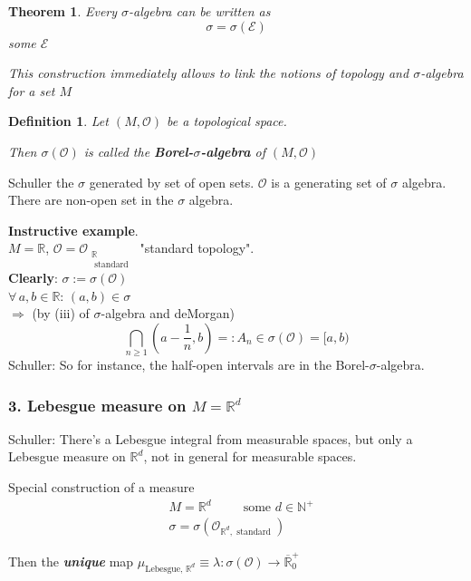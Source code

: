 \documentclass[10pt]{amsart}
\newtheorem{theorem}{Theorem}
\newtheorem{definition}{Definition}
\begin{document}
\begin{multicols*}{2}
\begin{theorem}
	Every $\sigma$-algebra can be written as
	\[
	\sigma = \sigma(\mathcal{E})
	\] some $\mathcal{E}$

This construction immediately allows to link the notions of topology and $\sigma$-algebra for a set $M$
\end{theorem}

\begin{definition}
	Let $(M, \mathcal{O})$ be a topological space.
	
	Then $\sigma(\mathcal{O})$ is called the \textbf{Borel-$\sigma$-algebra} of $(M, \mathcal{O})$
\end{definition}
Schuller the $\sigma$ generated by set of open sets. $\mathcal{O}$ is a generating set of $\sigma$ algebra. There are non-open set in the $\sigma$ algebra.

\textbf{Instructive example}. \\
$M = \mathbb{R}$, $\mathcal{O} = \mathcal{O}_{ \substack{ \mathbb{R} \\ \text{ standard } } }$ "standard topology". \\

\textbf{Clearly}: $\sigma := \sigma(\mathcal{O})$ \\

$\forall \, a, b \in \mathbb{R}$: $(a,b) \in \sigma$ \\

$\Longrightarrow$ (by (iii) of $\sigma$-algebra and deMorgan) 
\[
\bigcap_{n \geq 1} \left( a - \frac{1}{n}, b \right) =: A_n \in \sigma(\mathcal{O}) = [a, b)
 \]
Schuller: So for instance, the half-open intervals are in the Borel-$\sigma$-algebra.

\subsubsection{3. Lebesgue measure on $M = \mathbb{R}^d$}

Schuller: There's a Lebesgue integral from measurable spaces, but only a Lebesgue measure on $\mathbb{R}^d$, not in general for measurable spaces.

Special construction of a measure 
\[
\begin{aligned}
	& M = \mathbb{R}^d \quad \quad \, \text{ some } d \in \mathbb{N}^+ \\
	& \sigma = \sigma \left( \mathcal{O}_{\mathbb{R}^d, \text{ standard } } \right)
\end{aligned}
\]

Then the \emph{\textbf{unique}} map $\mu_{\text{Lebesgue, $\mathbb{R}^d$} } \equiv \lambda : \sigma(\mathcal{O}) \to \overline{ \mathbb{R}}^+_0$ \\


\end{multicols*}
\end{document}
